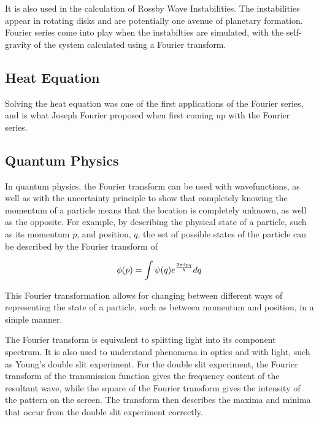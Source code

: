 \documentclass{article}
\begin{document}
It is also used in the calculation of Rossby Wave Instabilities. The instabilities appear in rotating disks and are potentially one avenue of planetary formation. Fourier series come into play when the instabilties are simulated, with the self-gravity of the system calculated using a Fourier transform.
\subsection{Heat Equation}
Solving the heat equation was one of the first applications of the Fourier series, and is what Joseph Fourier proposed when first coming up with the Fourier series.

\subsection{Quantum Physics}
In quantum physics, the Fourier transform can be used with wavefunctions, as well as with the uncertainty principle to show that completely knowing the momentum of a particle means that the location is completely unknown, as well as the opposite. For example, by describing the physical state of a particle, such as its momentum $p$, and position, $q$, the set of possible states of the particle can be described by the Fourier transform of 

$$\phi(p) = \int \psi (q) e^{2\pi i pq\over h} dq$$

This Fourier transformation allows for changing between different ways of representing the state of a particle, such as between momentum and position, in a simple manner. 

The Fourier transform is equivalent to splitting light into its component spectrum. It is also used to understand phenomena in optics and with light, such as Young's double slit experiment. For the double slit experiment, the Fourier transform of the transmission function gives the frequency content of the resultant wave, while the square of the Fourier transform gives the intensity of the pattern on the screen. The transform then describes the maxima and minima that occur from the double slit experiment correctly.\cite{Optics}
\end{document}
